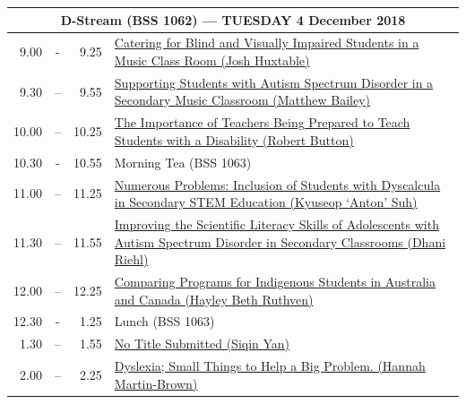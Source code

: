 \documentclass[twoside,12pt,a4paper,notitlepage]{memoir}
\begin{document}
\pagebreak
\begin{center}
\begin{tabular}{rcr|p{10.8cm}}
 \multicolumn{4}{c}{{\large D-Stream (BSS 1062) --- TUESDAY 4 December 2018}} \\ \hline
9.00 & - & 9.25 &
 \hyperref[aut:huxtable]{Catering for Blind and Visually Impaired Students in a Music Class Room (Josh Huxtable)} \\ \hline
9.30 & – & 9.55 &
 \hyperref[aut:bailey]{Supporting Students with Autism Spectrum Disorder in a Secondary Music Classroom (Matthew Bailey)} \\ \hline
10.00 & – & 10.25 &
 \hyperref[aut:button]{The Importance of Teachers Being Prepared to Teach Students with a Disability
 (Robert Button)} \\ \hline
10.30 & - & 10.55 & Morning Tea (BSS 1063) \\ \hline
11.00 & – & 11.25 & 
\hyperref[aut:suh]{Numerous Problems: Inclusion of Students with Dyscalcula in Secondary STEM Education (Kyuseop `Anton' Suh)} \\ \hline
11.30 & – & 11.55 &
 \hyperref[aut:riehl]{Improving the Scientific Literacy Skills of Adolescents with Autism Spectrum Disorder in Secondary Classrooms (Dhani Riehl)} \\ \hline
12.00 & – & 12.25 &
 \hyperref[aut:ruthven]{Comparing Programs for Indigenous Students in Australia and Canada (Hayley Beth Ruthven)} \\ \hline
12.30 & - & 1.25 & Lunch (BSS 1063) \\ \hline
1.30 & – & 1.55 &
 \hyperref[aut:yan]{No Title Submitted (Siqin Yan)} \\ \hline
2.00 & – & 2.25 & 
 \hyperref[aut:brown]{Dyslexia; Small Things to Help a Big Problem. (Hannah Martin-Brown)} \\ \hline
\end{tabular}
\end{center}
\end{document}
